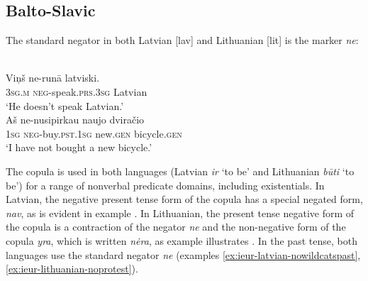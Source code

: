 \documentclass[output=paper,colorlinks,citecolor=brown]{langscibook}
\begin{document}
\subsection{Balto-Slavic}\label{sec:ieur-4.3}

The standard negator in both Latvian [lav] and Lithuanian [lit] is the marker \textit{ne}:
%
\begin{exe}
\ex\label{ex:ieur-latvian-speak}
\\
    \gll Viņš ne-runā latviski. \\
\textsc{3sg.m} \textsc{neg}-speak.\textsc{prs.3sg} Latvian \\
    \glt `He doesn't speak Latvian.' 
\ex\label{ex:ieur-lithuanian-bicycle}
\\
    \gll Aš ne-nusipirkau naujo dviračio \\
\textsc{1sg} \textsc{neg}-buy.\textsc{pst.1sg}  new.\textsc{gen} bicycle.\textsc{gen} \\
    \glt `I have not bought a new bicycle.' 
    \end{exe}
%
The copula is used in both languages (Latvian \textit{ir} `to be' and
Lithuanian \textit{būti} `to be') for a range of nonverbal predicate
domains, including existentials. In Latvian, the negative
present tense form of the copula has a special negated form, \textit{nav},
as is evident in example . In
Lithuanian, the present tense negative form of the copula is
a contraction of the negator \textit{ne} and the non-negative form of the
copula \textit{yra}, which is written \textit{nėra}, as example
 illustrates
\citep[1976]{Mathiassen1996}. In the past tense, both languages use the
standard negator \textit{ne} (examples
\ref{ex:ieur-latvian-nowildcatspast}, \ref{ex:ieur-lithuanian-noprotest}). 
\end{document}
